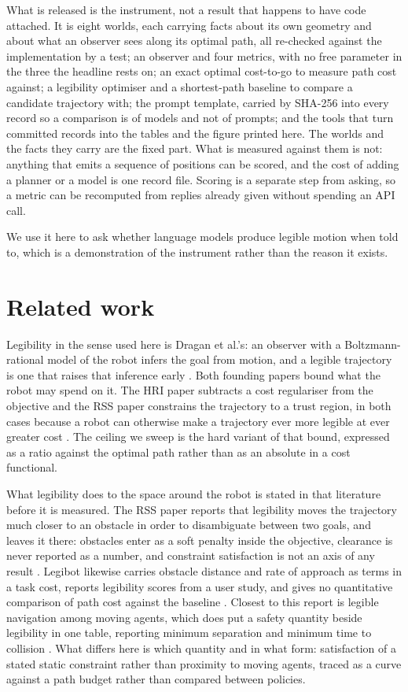 \documentclass[sigconf,nonacm]{acmart}
\begin{document}
What is released is the instrument, not a result that happens to have
code attached. It is eight worlds, each carrying facts about its own
geometry and about what an observer sees along its optimal path, all
re-checked against the implementation by a test; an observer and four
metrics, with no free parameter in the three the headline rests on; an exact optimal cost-to-go to measure path cost against; a
legibility optimiser and a shortest-path baseline to compare a candidate
trajectory with; the prompt template, carried by SHA-256 into every
record so a comparison is of models and not of prompts; and the tools
that turn committed records into the tables and the figure printed here.
The worlds and the facts they carry are the fixed part. What is measured
against them is not: anything that emits a sequence of positions can be
scored, and the cost of adding a planner or a model is one record file.
Scoring is a separate step from asking, so a metric can be recomputed
from replies already given without spending an API call.

We use it here to ask whether language models produce legible motion when
told to, which is a demonstration of the instrument rather than the
reason it exists.

\section{Related work}

Legibility in the sense used here is Dragan et al.'s: an observer with a
Boltzmann-rational model of the robot infers the goal from motion, and a
legible trajectory is one that raises that inference early
\cite{dragan2013legibility}. Both founding papers bound what the robot may
spend on it. The HRI paper subtracts a cost regulariser from the objective
and the RSS paper constrains the trajectory to a trust region, in both
cases because a robot can otherwise make a trajectory ever more legible at
ever greater cost \cite{dragan2013generating}. The ceiling we sweep is the
hard variant of that bound, expressed as a ratio against the optimal path
rather than as an absolute in a cost functional.

What legibility does to the space around the robot is stated in that
literature before it is measured. The RSS paper reports that legibility
moves the trajectory much closer to an obstacle in order to disambiguate
between two goals, and leaves it there: obstacles enter as a soft penalty
inside the objective, clearance is never reported as a number, and
constraint satisfaction is not an axis of any result
\cite{dragan2013generating}. Legibot likewise carries obstacle distance
and rate of approach as terms in a task cost, reports legibility scores
from a user study, and gives no quantitative comparison of path cost
against the baseline \cite{amirian2024legibot}. Closest to this report is
legible navigation among moving agents, which does put a safety quantity
beside legibility in one table, reporting minimum separation and minimum
time to collision \cite{bastarache2023legible}. What differs here is which
quantity and in what form: satisfaction of a stated static constraint
rather than proximity to moving agents, traced as a curve against a path
budget rather than compared between policies.
\end{document}
